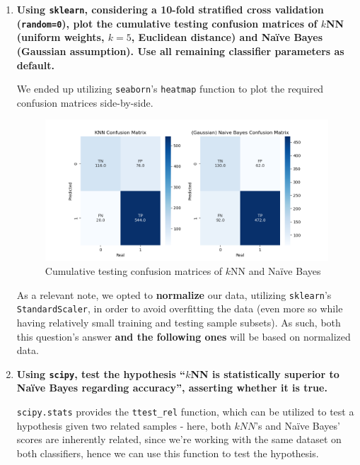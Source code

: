\documentclass[12pt]{article}
\begin{document}
\begin{enumerate}[leftmargin=\labelsep,resume]
  \item \textbf{Using \texttt{sklearn}, considering a 10-fold stratified cross validation (\texttt{random=0}), plot the cumulative
  testing confusion matrices of $k$NN (uniform weights, $k = 5$, Euclidean distance) and Naïve Bayes
  (Gaussian assumption). Use all remaining classifier parameters as default.}

  We ended up utilizing \texttt{seaborn}'s \texttt{heatmap} function to plot the
  required confusion matrices side-by-side.

  \begin{figure}[h]
    \centering
    \includegraphics[width=1.1\textwidth]{../assets/hw2-2.1.png}
    \caption{Cumulative testing confusion matrices of $k$NN and Naïve Bayes}
    \label{fig:fig1}
  \end{figure}

  As a relevant note, we opted to \textbf{normalize} our data, utilizing \texttt{sklearn}'s
  \texttt{StandardScaler}, in order to avoid overfitting the data (even more so while
  having relatively small training and testing sample subsets). As such, both this
  question's answer \textbf{and the following ones} will be based on normalized data.

  \pagebreak

  \item \textbf{Using \texttt{scipy}, test the hypothesis “$k$NN is statistically superior to Naïve Bayes regarding
  accuracy”, asserting whether it is true.}

  \texttt{scipy.stats} provides the \texttt{ttest\_rel} function, which can be utilized
  to test a hypothesis given two related samples - here, both $kNN$'s and Naïve Bayes'
  scores are inherently related, since we're working with the same dataset on both
  classifiers, hence we can use this function to test the hypothesis.
  

\end{enumerate}
\end{document}
